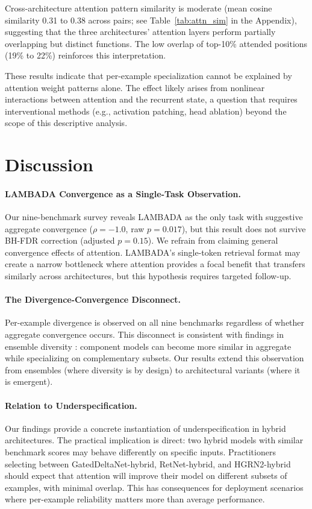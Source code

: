 \documentclass[11pt,a4paper]{article}
\begin{document}
Cross-architecture attention pattern similarity is moderate (mean cosine similarity 0.31 to 0.38 across pairs; see Table~\ref{tab:attn_sim} in the Appendix), suggesting that the three architectures' attention layers perform partially overlapping but distinct functions. The low overlap of top-10\% attended positions (19\% to 22\%) reinforces this interpretation.

These results indicate that per-example specialization cannot be explained by attention weight patterns alone. The effect likely arises from nonlinear interactions between attention and the recurrent state, a question that requires interventional methods (e.g., activation patching, head ablation) beyond the scope of this descriptive analysis.

\section{Discussion}

\paragraph{LAMBADA Convergence as a Single-Task Observation.}
Our nine-benchmark survey reveals LAMBADA as the only task with suggestive aggregate convergence ($\rho = -1.0$, raw $p = 0.017$), but this result does not survive BH-FDR correction (adjusted $p = 0.15$). We refrain from claiming general convergence effects of attention. LAMBADA's single-token retrieval format may create a narrow bottleneck where attention provides a focal benefit that transfers similarly across architectures, but this hypothesis requires targeted follow-up.

\paragraph{The Divergence-Convergence Disconnect.}
Per-example divergence is observed on all nine benchmarks regardless of whether aggregate convergence occurs. This disconnect is consistent with findings in ensemble diversity \citep{krogh1995neural, kuncheva2003measures}: component models can become more similar in aggregate while specializing on complementary subsets. Our results extend this observation from ensembles (where diversity is by design) to architectural variants (where it is emergent).

\paragraph{Relation to Underspecification.}
Our findings provide a concrete instantiation of underspecification \citep{damour2022underspecification} in hybrid architectures. The practical implication is direct: two hybrid models with similar benchmark scores may behave differently on specific inputs. Practitioners selecting between GatedDeltaNet-hybrid, RetNet-hybrid, and HGRN2-hybrid should expect that attention will improve their model on different subsets of examples, with minimal overlap. This has consequences for deployment scenarios where per-example reliability matters more than average performance.
\end{document}
